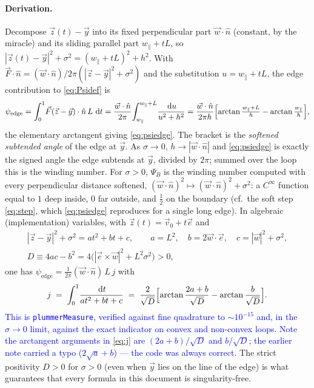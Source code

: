 \documentclass[11pt]{article}
\newcommand{\aside}[1]{\textcolor{blue}{#1}}
\newcommand{\atan}{\operatorname{arctan}}
\newcommand{\dd}{\,\mathrm{d}}
\begin{document}
\paragraph{Derivation.}  Decompose $\vec z(t)-\vec y$ into its fixed perpendicular
part $\vec w\cdot\hat n$ (constant, by the miracle) and its sliding parallel part
$w_\parallel+tL$, so $|\vec z(t)-\vec y|^2+\sigma^2=(w_\parallel+tL)^2+h^2$.  With
$\vec F\cdot\hat n=(\vec w\cdot\hat n)/2\pi(|\vec z-\vec y|^2+\sigma^2)$ and the
substitution $u=w_\parallel+tL$, the edge contribution to \eqref{eq:Psidef} is
\[
  \psi_{\text{edge}} = \int_0^1\!\vec F(\vec z-\vec y)\cdot\hat n\,L\,\dd t
  = \frac{\vec w\cdot\hat n}{2\pi}\!\int_{w_\parallel}^{w_\parallel+L}\!
    \frac{\dd u}{u^2+h^2}
  = \frac{\vec w\cdot\hat n}{2\pi h}
    \Bigl[\atan\tfrac{w_\parallel+L}{h}-\atan\tfrac{w_\parallel}{h}\Bigr],
\]
the elementary arctangent giving \eqref{eq:psiedge}.  The bracket is the
\emph{softened subtended angle} of the edge at $\vec y$.
As $\sigma\to0$, $h\to|\vec w\cdot\hat n|$ and \eqref{eq:psiedge} is exactly the
signed angle the edge subtends at $\vec y$, divided by $2\pi$; summed over the loop
this is the winding number.  For $\sigma>0$, $\Psi_B$ is the winding number computed
with every perpendicular distance softened,
$(\vec w\cdot\hat n)^2 \mapsto (\vec w\cdot\hat n)^2+\sigma^2$: a $C^\infty$
function equal to $1$ deep inside, $0$ far outside, and $\tfrac12$ on the boundary
(cf.\ the soft step \eqref{eq:step}, which \eqref{eq:psiedge} reproduces for a single
long edge).  In algebraic (implementation) variables, with
$\vec z(t)=\vec v_0+t\vec e$ and
\begin{equation}
\begin{gathered}
  |\vec z-\vec y|^2+\sigma^2 = a t^2+bt+c,\qquad
  a=L^2,\quad b=2\vec w\cdot\vec e,\quad c=|\vec w|^2+\sigma^2,\\
  D \equiv 4ac-b^2 = 4\bigl(|\vec e\times\vec w|^2+L^2\sigma^2\bigr) > 0,
\end{gathered}
  \label{eq:abcD}
\end{equation}
one has $\psi_{\text{edge}} = \tfrac{1}{2\pi}(\vec w\cdot\hat n)\,L\,j$ with
\begin{equation}
  j \;=\; \int_0^1\!\frac{\dd t}{at^2+bt+c}
    \;=\; \frac{2}{\sqrt D}\Bigl[\atan\frac{2a+b}{\sqrt D}-\atan\frac{b}{\sqrt D}\Bigr].
  \label{eq:j}
\end{equation}
\aside{This is \texttt{plummerMeasure}, verified against fine quadrature to
$\sim10^{-15}$ and, in the $\sigma\to0$ limit, against the exact indicator on convex
and non-convex loops.  Note the arctangent arguments in \eqref{eq:j} are
$(2a+b)/\sqrt D$ and $b/\sqrt D$; the earlier note carried a typo
($2\sqrt a+b$) --- the code was always correct.}
The strict positivity $D>0$ for $\sigma>0$ (even when $\vec y$ lies on the line of
the edge) is what guarantees that every formula in this document is
singularity-free.
\end{document}
